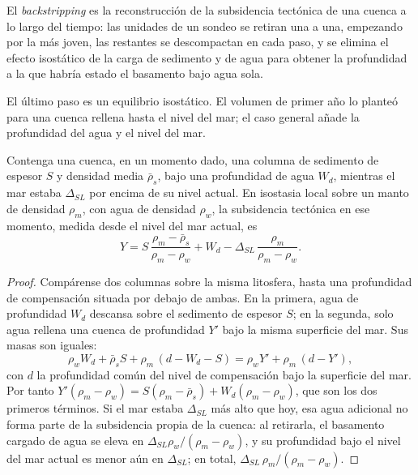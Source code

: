 \begin{definition}[Backstripping]\label{def:b2:basins-compared:backstripping}
El \emph{backstripping} es la reconstrucción de la subsidencia tectónica de una
cuenca a lo largo del tiempo: las unidades de un sondeo se retiran una a una, empezando por la más joven, las
restantes se descompactan en cada paso, y se elimina el efecto isostático de la carga de sedimento y de agua
para obtener la profundidad a la que habría estado el basamento bajo agua sola.
\end{definition}

El último paso es un equilibrio isostático. El volumen de primer año lo planteó para una cuenca rellena hasta el nivel del mar;
el caso general añade la profundidad del agua y el nivel del mar.

\begin{proposition}\label{prop:b2:basins-compared:backstrip}
Contenga una cuenca, en un momento dado, una columna de sedimento de espesor $S$ y densidad media
$\bar\rho_s$, bajo una profundidad de agua $W_d$, mientras el mar estaba $\Delta_{SL}$ por encima de su nivel
actual. En isostasia local sobre un manto de densidad $\rho_m$, con agua de densidad $\rho_w$, la
subsidencia tectónica en ese momento, medida desde el nivel del mar actual, es
\[
  Y = S\,\frac{\rho_m - \bar\rho_s}{\rho_m - \rho_w} + W_d
      - \Delta_{SL}\,\frac{\rho_m}{\rho_m - \rho_w}.
\]
\end{proposition}

\begin{proof}
Compárense dos columnas sobre la misma litosfera, hasta una profundidad de compensación situada por debajo de ambas. En
la primera, agua de profundidad $W_d$ descansa sobre el sedimento de espesor $S$; en la segunda, solo agua
rellena una cuenca de profundidad $Y'$ bajo la misma superficie del mar. Sus masas son iguales:
\[
  \rho_w W_d + \bar\rho_s S + \rho_m\,(d - W_d - S) = \rho_w Y' + \rho_m\,(d - Y'),
\]
con $d$ la profundidad común del nivel de compensación bajo la superficie del mar. Por tanto
$Y'(\rho_m - \rho_w) = S(\rho_m - \bar\rho_s) + W_d(\rho_m - \rho_w)$, que son los dos primeros
términos. Si el mar estaba $\Delta_{SL}$ más alto que hoy, esa agua adicional no forma parte de la
subsidencia propia de la cuenca: al retirarla, el basamento cargado de agua se eleva en
$\Delta_{SL}\rho_w/(\rho_m - \rho_w)$, y su profundidad bajo el nivel del mar actual es menor aún en
$\Delta_{SL}$; en total, $\Delta_{SL}\,\rho_m/(\rho_m - \rho_w)$.
\end{proof}

